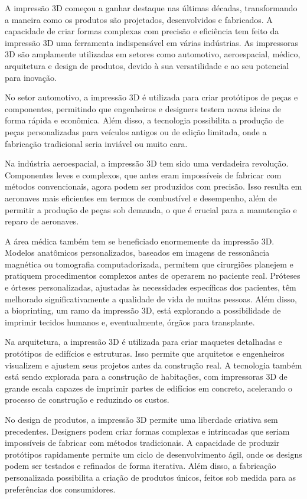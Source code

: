 \documentclass[
]{book}
\begin{document}
A impressão 3D começou a ganhar destaque nas últimas décadas, transformando a maneira como os produtos são projetados, desenvolvidos e fabricados. A capacidade de criar formas complexas com precisão e eficiência tem feito da impressão 3D uma ferramenta indispensável em várias indústrias. As impressoras 3D são amplamente utilizadas em setores como automotivo, aeroespacial, médico, arquitetura e design de produtos, devido à sua versatilidade e ao seu potencial para inovação.

No setor automotivo, a impressão 3D é utilizada para criar protótipos de peças e componentes, permitindo que engenheiros e designers testem novas ideias de forma rápida e econômica. Além disso, a tecnologia possibilita a produção de peças personalizadas para veículos antigos ou de edição limitada, onde a fabricação tradicional seria inviável ou muito cara.

Na indústria aeroespacial, a impressão 3D tem sido uma verdadeira revolução. Componentes leves e complexos, que antes eram impossíveis de fabricar com métodos convencionais, agora podem ser produzidos com precisão. Isso resulta em aeronaves mais eficientes em termos de combustível e desempenho, além de permitir a produção de peças sob demanda, o que é crucial para a manutenção e reparo de aeronaves.

A área médica também tem se beneficiado enormemente da impressão 3D. Modelos anatômicos personalizados, baseados em imagens de ressonância magnética ou tomografia computadorizada, permitem que cirurgiões planejem e pratiquem procedimentos complexos antes de operarem no paciente real. Próteses e órteses personalizadas, ajustadas às necessidades específicas dos pacientes, têm melhorado significativamente a qualidade de vida de muitas pessoas. Além disso, a bioprinting, um ramo da impressão 3D, está explorando a possibilidade de imprimir tecidos humanos e, eventualmente, órgãos para transplante.

Na arquitetura, a impressão 3D é utilizada para criar maquetes detalhadas e protótipos de edifícios e estruturas. Isso permite que arquitetos e engenheiros visualizem e ajustem seus projetos antes da construção real. A tecnologia também está sendo explorada para a construção de habitações, com impressoras 3D de grande escala capazes de imprimir partes de edifícios em concreto, acelerando o processo de construção e reduzindo os custos.

No design de produtos, a impressão 3D permite uma liberdade criativa sem precedentes. Designers podem criar formas complexas e intrincadas que seriam impossíveis de fabricar com métodos tradicionais. A capacidade de produzir protótipos rapidamente permite um ciclo de desenvolvimento ágil, onde os designs podem ser testados e refinados de forma iterativa. Além disso, a fabricação personalizada possibilita a criação de produtos únicos, feitos sob medida para as preferências dos consumidores.
\end{document}
